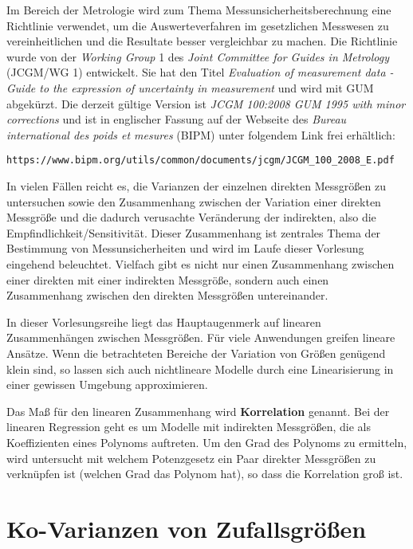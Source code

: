Im Bereich der Metrologie wird zum Thema Messunsicherheitsberechnung eine Richtlinie verwendet,
um die Auswerteverfahren im gesetzlichen Messwesen zu vereinheitlichen und die Resultate
besser vergleichbar zu machen. Die Richtlinie wurde von der
\textsl{Working Group} 1 des \textsl{Joint Committee for Guides in Metrology} (JCGM/WG 1)
entwickelt. Sie hat den Titel \textsl{Evaluation of measurement
data - Guide to the expression of uncertainty in measurement} und wird mit GUM abgekürzt.
Die derzeit gültige Version ist
\textsl{JCGM 100:2008 GUM 1995 with minor corrections} und ist in englischer Fassung
auf der Webseite des \textsl{Bureau international des poids et mesures} (BIPM)
unter folgendem Link frei erhältlich:
\begin{verbatim}
https://www.bipm.org/utils/common/documents/jcgm/JCGM_100_2008_E.pdf
\end{verbatim}

In vielen Fällen reicht es, die Varianzen der einzelnen direkten Messgrößen zu untersuchen sowie
den Zusammenhang zwischen der Variation einer direkten Messgröße und die dadurch verusachte
Veränderung der indirekten, also die Empfindlichkeit/Sensitivität.
Dieser Zusammenhang ist zentrales Thema der Bestimmung von Messunsicherheiten
und wird im Laufe dieser Vorlesung eingehend beleuchtet.
Vielfach gibt es nicht nur einen Zusammenhang zwischen einer direkten mit einer indirekten Messgröße,
sondern auch einen Zusammenhang zwischen den direkten Messgrößen untereinander.

In dieser Vorlesungsreihe liegt das Hauptaugenmerk auf linearen Zusammenhängen zwischen Messgrößen.
Für viele Anwendungen greifen lineare Ansätze. Wenn die betrachteten Bereiche der Variation von Größen
genügend klein sind, so lassen sich auch nichtlineare Modelle durch eine Linearisierung in einer gewissen
Umgebung approximieren.

Das Maß für den linearen Zusammenhang wird \textbf{Korrelation} genannt.
Bei der linearen Regression geht es um Modelle mit indirekten Messgrößen,
die als Koeffizienten eines Polynoms auftreten. Um den Grad des Polynoms zu ermitteln, wird untersucht
mit welchem Potenzgesetz ein Paar direkter Messgrößen zu verknüpfen ist (welchen Grad das Polynom hat),
so dass die Korrelation groß ist.


\section{Ko-Varianzen von Zufallsgrößen}
\label{Kap1Kovarianzen}

